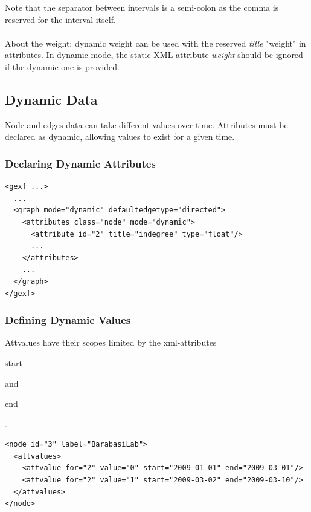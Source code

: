 \documentclass[a4paper,10pt]{article}
\begin{document}
Note that the separator between intervals is a semi-colon as the comma is reserved for the interval itself.

\paragraph{}
About the weight: dynamic weight can be used with the reserved \textit{title} "weight" in attributes. In dynamic mode, the static XML-attribute \textit{weight} should be ignored if the dynamic one is provided.

\subsection{Dynamic Data}

Node and edges data can take different values over time. Attributes must be declared as dynamic, allowing values to exist for a given time.

\subsubsection{Declaring Dynamic Attributes}

\lstset{ style=gexf }
\begin{lstlisting}[caption={Indegree may change over time}]
<gexf ...>
  ...
  <graph mode="dynamic" defaultedgetype="directed">
    <attributes class="node" mode="dynamic">
      <attribute id="2" title="indegree" type="float"/>
      ...
    </attributes>
    ...
  </graph>
</gexf>
\end{lstlisting}

\subsubsection{Defining Dynamic Values}

Attvalues have their scopes limited by the xml-attributes \begin{footnotesize}start\end{footnotesize} and \begin{footnotesize}end\end{footnotesize}.

\lstset{ style=gexf }
\begin{lstlisting}[caption={Data value changing over time}]
<node id="3" label="BarabasiLab">
  <attvalues>
    <attvalue for="2" value="0" start="2009-01-01" end="2009-03-01"/>
    <attvalue for="2" value="1" start="2009-03-02" end="2009-03-10"/>
  </attvalues>
</node>
\end{lstlisting}
\end{document}
